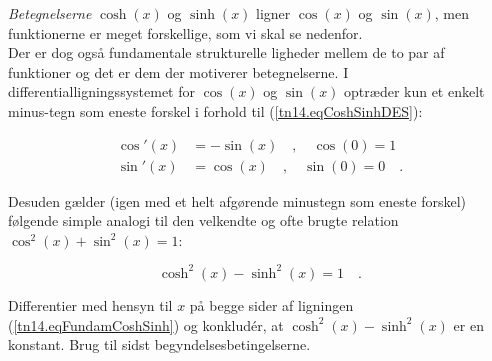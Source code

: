 \emph{Betegnelserne} $\cosh(x)$ og $\sinh(x)$ ligner $\cos(x)$ og $\sin(x)$,
men funktionerne er meget forskellige, som vi skal se nedenfor.\\

Der er dog også fundamentale strukturelle ligheder mellem de to par af funktioner og det er dem der motiverer betegnelserne.
I differentialligningssystemet for $\cos(x)$ og $\sin(x)$ optræder kun et enkelt
minus-tegn som eneste forskel i forhold til (\ref{tn14.eqCoshSinhDES}):

\begin{equation}
\begin{aligned}
\cos'(x) &= -\sin(x) \quad , \quad \cos(0) = 1 \\
\sin'(x) &= \cos(x) \quad , \quad \sin(0) = 0 \quad .
\end{aligned}
\end{equation}

Desuden gælder (igen med et helt afgørende minustegn som eneste forskel) følgende  simple
analogi til den velkendte og ofte brugte relation $\cos^{2}(x) + \sin^{2}(x) = 1$:

\begin{theorem}
\begin{equation} \label{tn14.eqFundamCoshSinh}
\cosh^{2}(x) - \sinh^{2}(x) = 1 \quad.
\end{equation}
\end{theorem}
\begin{bevis}
Differentier med hensyn til $x$ på begge sider af ligningen (\ref{tn14.eqFundamCoshSinh}) og konklud\'{e}r, at $\cosh^{2}(x) - \sinh^{2}(x)$ er en konstant. Brug
til sidst begyndelsesbetingelserne.
\end{bevis}

